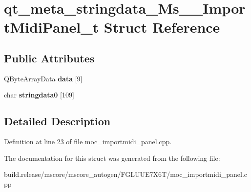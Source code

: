 \hypertarget{structqt__meta__stringdata___ms_____import_midi_panel__t}{}\section{qt\+\_\+meta\+\_\+stringdata\+\_\+\+Ms\+\_\+\+\_\+\+Import\+Midi\+Panel\+\_\+t Struct Reference}
\label{structqt__meta__stringdata___ms_____import_midi_panel__t}
\subsection*{Public Attributes}
\begin{DoxyCompactItemize}
\item 
\mbox{\label{structqt__meta__stringdata___ms_____import_midi_panel__t_a73b23d0c1a7df0526451f20527da3778}} 
Q\+Byte\+Array\+Data {\bfseries data} \mbox{[}9\mbox{]}
\item 
\mbox{\label{structqt__meta__stringdata___ms_____import_midi_panel__t_acc933f29d3145a7ddb78e927a239254d}} 
char {\bfseries stringdata0} \mbox{[}109\mbox{]}
\end{DoxyCompactItemize}


\subsection{Detailed Description}


Definition at line 23 of file moc\+\_\+importmidi\+\_\+panel.\+cpp.



The documentation for this struct was generated from the following file\+:\begin{DoxyCompactItemize}
\item 
build.\+release/mscore/mscore\+\_\+autogen/\+F\+G\+L\+U\+U\+E7\+X6\+T/moc\+\_\+importmidi\+\_\+panel.\+cpp\end{DoxyCompactItemize}
